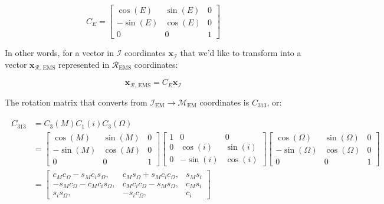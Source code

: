 \documentclass[]{article}
\begin{document}
	\begin{equation}
		C_E = \begin{bmatrix}
			 \cos{(E)} & \sin{(E)} & 0 \\
			-\sin{(E)} & \cos{(E)} & 0 \\
		 	 0 & 0 & 1
		\end{bmatrix}
	\end{equation}
	
	In other words, for a vector in $\mathcal{I}$ coordinates $\mathbf{x}_\mathcal{I}$ that we'd like to transform into a vector $\mathbf{x}_{\mathcal{R}\text{, EMS}}$ represented in $\mathcal{R}_\text{EMS}$ coordinates:
	
	\begin{equation}
		\mathbf{x}_{\mathcal{R}\text{, EMS}} = C_E \mathbf{x}_\mathcal{I}
	\end{equation}
	
	The rotation matrix that converts from $\mathcal{I}_\text{EM}\rightarrow\mathcal{M}_\text{EM}$ coordinates is $C_\text{313}$, or:
	
	\begin{align}
	\begin{split}
		C_\text{313}
		&= C_3(M) C_1(i) C_3(\Omega) \\
		&= \begin{bmatrix}
			\cos{(M)} & \sin{(M)} & 0 \\
			-\sin{(M)} & \cos{(M)} & 0 \\
			0 & 0 & 1
		\end{bmatrix} \begin{bmatrix}
			1 & 0 & 0 \\
			0 & \cos{(i)} & \sin{(i)} \\
			0 & -\sin{(i)} & \cos{(i)}
		\end{bmatrix}\begin{bmatrix}
			\cos{(\Omega)} & \sin{(\Omega)} & 0 \\
			-\sin{(\Omega)} & \cos{(\Omega)} & 0 \\
			0 & 0 & 1
		\end{bmatrix} \\
		&= \begin{bmatrix}
			c_M c_\Omega - s_M c_i s_\Omega, & c_M s_\Omega + s_M c_i c_\Omega, & s_M s_i \\
			-s_M c_\Omega - c_M c_i s_\Omega, & c_M c_i c_\Omega - s_M s_\Omega, & c_M s_i \\
			s_i s_\Omega, & -s_i c_\Omega, & c_i
		\end{bmatrix}
	\end{split}
	\end{align}
	
\end{document}
